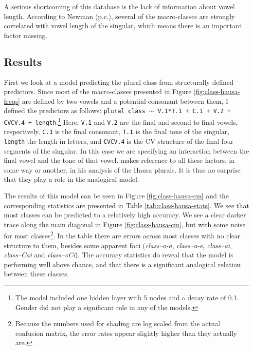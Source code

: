 A serious shortcoming of this database is the lack of information about vowel length. According to Newman (p.c.), several of the macro-classes are strongly correlated with vowel length of the singular, which means there is an important factor missing.

\subsection{Results}

First we look at a model predicting the plural class from structurally defined predictors. Since most of the macro-classes presented in Figure \ref{fig:class-hausa-freqs} are defined by two vowels and a potential consonant between them, I defined the predictors as follows: \texttt{plural class $\sim$ V.1*T.1 + C.1 + V.2 + CVCV.4 + length}.\footnote{The model included one hidden layer with 5 nodes and a decay rate of 0.1. Gender did not play a significant role in any of the models.} Here, \texttt{V.1} and \texttt{V.2} are the final and second to final vowels, respectively, \texttt{C.1} is the final consonant, \texttt{T.1} is the final tone of the singular, \texttt{length} the length in letters, and \texttt{CVCV.4} is the CV structure of the final four segments of the singular. In this case we are specifying an interaction between the final vowel and the tone of that vowel. \textcite[chapter 56]{Newman.2000} makes reference to all these factors, in some way or another, in his analysis of the Hausa plurals. It is thus no surprise that they play a role in the analogical model.

The results of this model can be seen in Figure \ref{fig:class-hausa-cm} and the corresponding statistics are presented in Table \ref{tab:class-hausa-stats}. We see that most classes can be predicted to a relatively high accuracy. We see a clear darker trace along the main diagonal in Figure \ref{fig:class-hausa-cm}, but with some noise for most classes\footnote{Because the numbers used for shading are log scaled from the actual confusion matrix, the error rates appear slightly higher than they actually are.}. In the table there are errors across most classes with no clear structure to them, besides some apparent foci (\textit{class--a-a}, \textit{class--a-e}, \textit{class--ai}, \textit{class--Cai} and \textit{class--oCi}). The accuracy statistics do reveal that the model is performing well above chance, and that there is a significant analogical relation between these classes.

